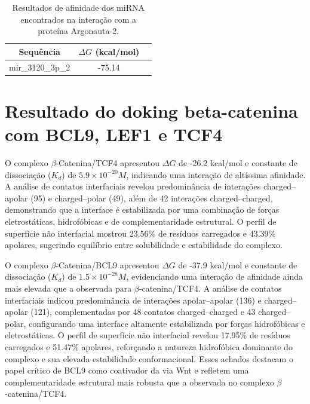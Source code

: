 \begin{table}[H]
    \centering
    \caption{Resultados de afinidade dos miRNA encontrados na interação com a proteína Argonauta-2.}
    \begin{tabular}{ccc}
    \hline 
     Sequência    &  $\Delta G$ (kcal/mol)    \\ \hline

    mir\_3120\_3p\_2  & -75.14 \\  \hline
    \end{tabular}
    \label{tab:my_label}
\end{table}

\section{Resultado do doking beta-catenina com BCL9, LEF1 e TCF4}

O complexo $\beta$‑Catenina/TCF4 apresentou $\Delta G$ de -26.2 kcal/mol e constante de dissociação ($K_d$) de
$5.9 \times 10^{-20} M$, indicando uma interação de altíssima afinidade. A análise de contatos interfaciais
revelou predominância de interações charged–apolar (95) e charged–polar (49), além de 42
interações charged–charged, demonstrando que a interface é estabilizada por uma combinação de
forças eletrostáticas, hidrofóbicas e de complementaridade estrutural. O perfil de superfície não
interfacial mostrou 23.56\% de resíduos carregados e 43.39\% apolares, sugerindo equilíbrio entre
solubilidade e estabilidade do complexo.

O complexo $\beta$‑Catenina/BCL9 apresentou $\Delta G$ de -37.9 kcal/mol e constante de dissociação
($K_d$) de $1.5 \times 10^{-28} M$, evidenciando uma interação de afinidade ainda mais elevada que a
observada para $\beta$‑catenina/TCF4. A análise de contatos interfaciais indicou predominância
de interações apolar–apolar (136) e charged–apolar (121), complementadas por 48 contatos
charged–charged e 43 charged–polar, configurando uma interface altamente estabilizada
por forças hidrofóbicas e eletrostáticas. O perfil de superfície não interfacial revelou 17.95\% de resíduos carregados e 
51.47\% apolares, reforçando a natureza hidrofóbica dominante do complexo e sua elevada estabilidade conformacional. 
Esses achados destacam o papel crítico de BCL9 como coativador da via Wnt e refletem uma complementaridade estrutural
mais robusta que a observada no complexo $\beta$‑catenina/TCF4.

